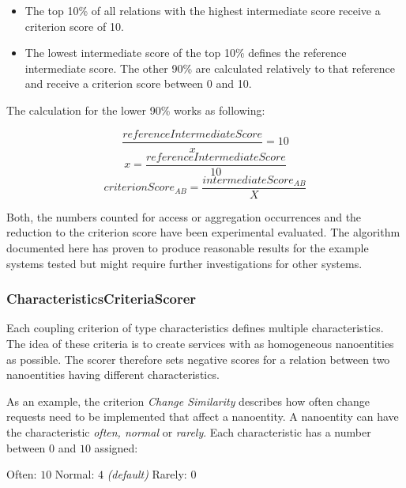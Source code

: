 \begin{itemize}
	\item The top 10\% of all relations with the highest intermediate score receive a criterion score of 10.
	\item The lowest intermediate score of the top 10\% defines the reference intermediate score. The other 90\% are calculated relatively to that reference and receive a criterion score between 0 and 10.
\end{itemize}

The calculation for the lower 90\% works as following:


\begin{equation}
\frac{referenceIntermediateScore}{x} = 10
\end{equation}
\begin{equation}
x = \frac{referenceIntermediateScore}{10}
\end{equation}
\begin{equation}
criterionScore_{AB} = \frac{intermediateScore_{AB}}{X}
\end{equation}

Both, the numbers counted for access or aggregation occurrences and the reduction to the criterion score have been experimental evaluated. The algorithm documented here has proven to produce reasonable results for the example systems tested but might require further investigations for other systems. 

\subsubsection{CharacteristicsCriteriaScorer}

Each coupling criterion of type characteristics defines multiple characteristics. The idea of these criteria is to create services with as homogeneous nanoentities as possible. The scorer therefore sets negative scores for a relation between two nanoentities having different characteristics. 

As an example, the criterion \textit{Change Similarity} describes how often change requests need to be implemented that affect a nanoentity. A nanoentity can have the characteristic \textit{often, normal} or \textit{rarely}. Each characteristic has a number between $0$ and $10$ assigned:

Often: $10$ \newline
Normal: $4$ \textit{(default)} \newline
Rarely: $0$ \newline

